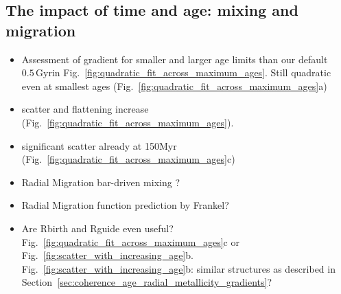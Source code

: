 \documentclass[fleqn,usenatbib]{mnras}
\newcommand{\nihaoAGEmax}{$0.5\,\mathrm{Gyr}$}
\begin{document}
\subsection{The impact of time and age: mixing and migration}

\begin{itemize}
    \item Assessment of gradient for smaller and larger age limits than our default \nihaoAGEmax in Fig.~\ref{fig:quadratic_fit_across_maximum_ages}. Still quadratic even at smallest ages (Fig.~\ref{fig:quadratic_fit_across_maximum_ages}a)
    \item scatter and flattening increase (Fig.~\ref{fig:quadratic_fit_across_maximum_ages}).
    \item significant scatter already at 150Myr (Fig.~\ref{fig:quadratic_fit_across_maximum_ages}c)
    \item Radial Migration \citep{Grand2015, Grand2016} bar-driven mixing \citep{DiMatteo2013}?
    \item Radial Migration function prediction by Frankel?
    \item Are Rbirth and Rguide even useful? Fig.~\ref{fig:quadratic_fit_across_maximum_ages}c or Fig.~\ref{fig:scatter_with_increasing_age}b.
    Fig.~\ref{fig:scatter_with_increasing_age}b: similar structures as described in Section~\ref{sec:coherence_age_radial_metallicity_gradients}? 
\end{itemize}
\end{document}
